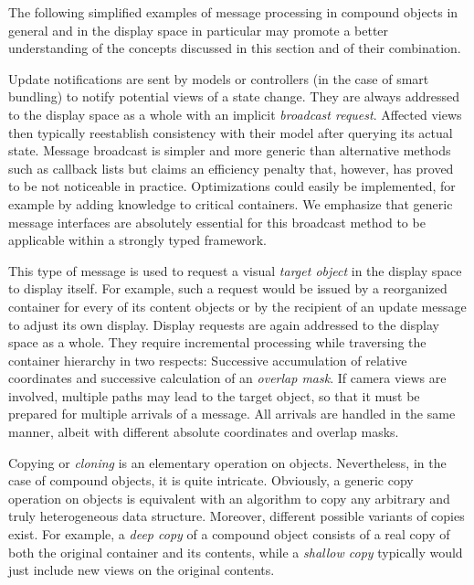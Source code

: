 \ein
The following simplified examples of message processing in compound objects
in general and in the display space in particular may promote a better
understanding
of the concepts discussed in this section and of their combination.


Update notifications are sent by models or controllers (in the case of smart
bundling) to notify potential views of a state change. They are always
addressed to the display space as a whole with an implicit {\em broadcast
request}. Affected views then typically reestablish consistency with their
model after querying its actual state.
Message broadcast is simpler and more generic than alternative methods
such as callback lists but claims an efficiency penalty that, however,
has proved to be not noticeable in practice. Optimizations could easily
be implemented, for example by adding knowledge to critical containers.
We emphasize that generic message interfaces are absolutely essential for
this broadcast method to be applicable within a strongly typed framework. 


This type of message is used to request a visual {\em target object\/}
in the display space to display itself. For example, such a request would be
issued by a reorganized container for every of its content objects or by the
recipient of an update message to adjust its own display. Display requests are
again addressed to the display space as a whole. They require incremental
processing while traversing the container hierarchy in two respects:
Successive accumulation of relative coordinates and successive calculation
of an {\em overlap mask}. If camera views are involved, multiple paths may
lead to the target object, so that it must be prepared for multiple arrivals
of a message. All arrivals are handled in the same manner, albeit with
different absolute coordinates and overlap masks.


Copying or {\em cloning\/} is an elementary operation on objects.
Nevertheless, in the case of compound objects, it is quite intricate.
Obviously, a generic copy operation on objects is equivalent with an
algorithm to copy any arbitrary and truly heterogeneous data structure.
Moreover, different possible variants of copies exist. For example, a 
{\em deep copy\/} of a compound object consists of a real copy of
both the original container and its contents, while a {\em shallow copy\/}
typically would just include new views on the original contents.

